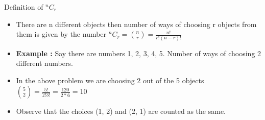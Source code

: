 \begin{frame}{Definition of $^nC_r$}
    \begin{itemize}
        \item There are n different objects then number of ways of choosing r objects from them is given by the number $^nC_r = {n\choose r} = \frac{n!}{r!(n-r)!}$
        \item {\bf{Example :}} Say there are numbers 1, 2, 3, 4, 5. Number of ways of choosing 2 different numbers.
        \item In the above problem we are choosing 2 out of the 5 objects ${5\choose 2} = \frac{5!}{2!3!} = \frac{120}{2*6} = 10$
        \item Observe that the choices (1, 2) and (2, 1) are counted as the same.
    \end{itemize}
\end{frame}